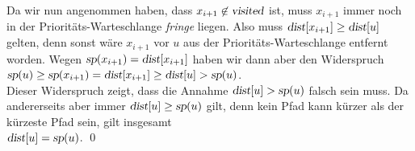 \begin{enumerate}
      Da wir nun angenommen haben, dass $x_{i+1} \not\in \textsl{visited}$ ist,
      muss $x_{i+1}$ immer noch in der Pri\-ori\-t\"ats-Warteschlange \textsl{fringe} liegen.
      Also muss $\textsl{dist}[x_{i+1}] \geq \textsl{dist}[u]$ gelten,
      denn sonst w\"are $x_{i+1}$ vor $u$ aus der Priorit\"ats-Warteschlange entfernt worden.
      Wegen $\textsl{sp}(x_{i+1}) = \textsl{dist}[x_{i+1}]$ haben wir dann aber
      den Widerspruch 
      \\[0.2cm]
      \hspace*{1.3cm} 
      $\textsl{sp}(u) \geq \textsl{sp}(x_{i+1}) = \textsl{dist}[x_{i+1}] \geq \textsl{dist}[u] > \textsl{sp}(u)$.
      \\[0.2cm]
      Dieser Widerspruch zeigt, dass die Annahme $\textsl{dist}[u] > \textsl{sp}(u)$ falsch sein muss.  Da andererseits aber immer
      $\textsl{dist}[u] \geq \textsl{sp}(u)$ gilt, denn kein Pfad kann k\"urzer als der k\"urzeste Pfad sein, gilt insgesamt
      \\[0.2cm]
      \hspace*{1.3cm}
      $\textsl{dist}[u] = \textsl{sp}(u)$. \qed
\end{enumerate}

